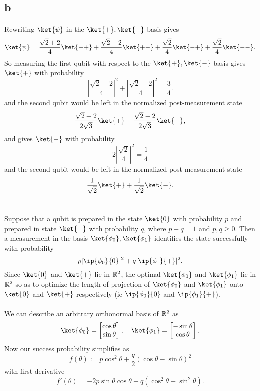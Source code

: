 \documentclass[letterpaper,12pt,oneside,onecolumn]{article}
\DeclarePairedDelimiter\abs{\lvert}{\rvert}%
\begin{document}
\subsection{b}
\paragraph{}
Rewriting $\ket{\psi}$ in the $\ket{+}, \ket{-}$ basis gives
$$\ket{\psi} = \frac{\sqrt{2} + 2}{4}\ket{++} + \frac{\sqrt{2}-2}{4}\ket{+-} + \frac{\sqrt{2}}{4}\ket{-+} + \frac{\sqrt{2}}{4}\ket{--}.$$
So measuring the first qubit with respect to the $\ket{+}, \ket{-}$ basis gives $\ket{+}$ with probability
$$|\frac{\sqrt{2}+2}{4}|^2+ |\frac{\sqrt{2}-2}{4}|^2 = \frac{3}{4}.$$
and the second qubit would be left in the normalized post-measurement state
$$ \frac{\sqrt{2} + 2}{2\sqrt{3}}\ket{+} + \frac{\sqrt{2}-2}{2\sqrt{3}}\ket{-},$$
and gives $\ket{-}$ with probability
$$2|\frac{\sqrt{2}}{4}|^2 = \frac{1}{4}$$
and the second qubit would be left in the normalized post-measurement state
$$\frac{1}{\sqrt{2}}\ket{+} + \frac{1}{\sqrt{2}}\ket{-} .$$
\section{}
\paragraph{}
Suppose that a qubit is prepared in the state $\ket{0}$ with probability $p$ and prepared in state $\ket{+}$ with probability $q$, where $p+q=1$ and $p,q\geq 0$. Then a measurement in the basis $\ket{\phi_0}, \ket{\phi_1}$ identifies the state successfully with probability
$$p\abs{\ip{\phi_0}{0}}^2 + q\abs{\ip{\phi_1}{+}}^2.$$
Since $\ket{0}$ and $\ket{+}$ lie in $\mathbb{R}^2$, the optimal $\ket{\phi_0}$ and $\ket{\phi_1}$ lie in $\mathbb{R}^2$ so as to optimize the length of projection of $\ket{\phi_0}$ and $\ket{\phi_1}$ onto $\ket{0}$ and $\ket{+}$ respectively (ie $\ip{\phi_0}{0}$ and $\ip{\phi_1}{+}$).
\paragraph{}
We can describe an arbitrary orthonormal basis of $\mathbb{R}^2$ as
$$\ket{\phi_0} = \begin{bmatrix} \cos\theta \\ \sin\theta \end{bmatrix}, \quad \ket{\phi_1}=\begin{bmatrix}-\sin\theta \\ \cos\theta \end{bmatrix}.$$
Now our success probability simplifies as
$$f(\theta) :=p\cos^2\theta + \frac{q}{2}(\cos\theta - \sin\theta)^2$$
with first derivative
$$f'(\theta) = -2p\sin\theta\cos\theta - q(\cos^2\theta - \sin^2\theta).$$
\end{document}
